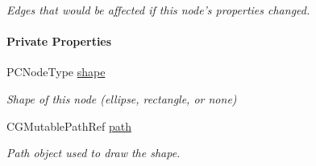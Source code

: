 \begin{Indent}
\begin{DoxyCompactItemize}
\begin{DoxyCompactList}\small\item\em Edges that would be affected if this node's properties changed. \end{DoxyCompactList}\end{DoxyCompactItemize}
\end{Indent}
\begin{Indent}\paragraph*{Private Properties}
\begin{DoxyCompactItemize}
\item 
\hypertarget{interface_p_c_graph_node_a4f7e73e94abb71c1cb2f960230b1dba3}{
PCNodeType \hyperlink{interface_p_c_graph_node_a4f7e73e94abb71c1cb2f960230b1dba3}{shape}}
\label{interface_p_c_graph_node_a4f7e73e94abb71c1cb2f960230b1dba3}

\begin{DoxyCompactList}\small\item\em Shape of this node (ellipse, rectangle, or none) \end{DoxyCompactList}\item 
\hypertarget{interface_p_c_graph_node_a755cfc30c164139d3dce1d1f7fd3d3e7}{
CGMutablePathRef \hyperlink{interface_p_c_graph_node_a755cfc30c164139d3dce1d1f7fd3d3e7}{path}}
\label{interface_p_c_graph_node_a755cfc30c164139d3dce1d1f7fd3d3e7}

\begin{DoxyCompactList}\small\item\em Path object used to draw the shape. \end{DoxyCompactList}\end{DoxyCompactItemize}
\end{Indent}
